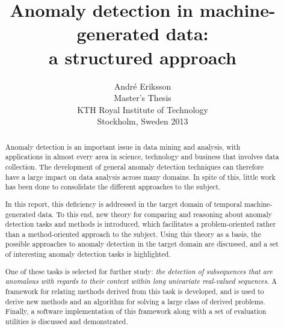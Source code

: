 \documentclass[a4paper,9pt,twoside]{report}
\date{}
\numberwithin{equation}{section}
\begin{document}
\title{Anomaly detection in machine-generated data:\\a structured approach}
\author{André Eriksson\\
Master's Thesis \\
KTH Royal Institute of Technology \\
Stockholm, Sweden 2013\\
}
\maketitle


\pagestyle{fancy}
\fancyhead{}
\fancyhead[RE,LO]{\leftmark}
\renewcommand{\headrulewidth}{0pt}

\setcounter{page}{0}

\begin{abstract}

Anomaly detection is an important issue in data mining and analysis, with applications in almost every area in science, technology and business that involves data collection. The development of general anomaly detection techniques can therefore have a large impact on data analysis across many domains. In spite of this, little work has been done to consolidate the different approaches to the subject.

In this report, this deficiency is addressed in the target domain of temporal machine-generated data. To this end, new theory for comparing and reasoning about anomaly detection tasks and methods is introduced, which facilitates a problem-oriented rather than a method-oriented approach to the subject. Using this theory as a basis, the possible approaches to anomaly detection in the target domain are discussed, and a set of interesting anomaly detection tasks is highlighted.

One of these tasks is selected for further study: \emph{the detection of subsequences that are anomalous with regards to their context within long univariate real-valued sequences}. A framework for relating methods derived from this task is developed, and is used to derive new methods and an algorithm for solving a large class of derived problems. Finally, a software implementation of this framework along with a set of evaluation utilities is discussed and demonstrated.
 
\end{abstract}
\end{document}
